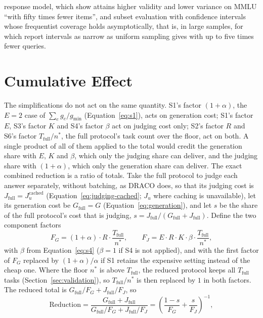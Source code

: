 \documentclass[11pt]{article}
\newcommand{\sectionbreak}{\par\ifdim\pagetotal<5.5\baselineskip\relax\else\clearpage\fi}
\begin{document}
response model, which \citet{hofmann2025fluid} show attains higher validity and lower
variance on MMLU ``with fifty times fewer items'', and subset evaluation with
confidence intervals whose frequentist coverage holds asymptotically, that is, in large samples, for which \citet{wu2026faq} report intervals as narrow as uniform sampling gives with up to five times fewer queries.

\sectionbreak
\section{Cumulative Effect}
\label{sec:cumulative}

The simplifications do not act on the same quantity. S1's factor $(1+\alpha)$, the $E = 2$ case of $\sum_{e} g_e / g_{\min}$ (Equation~\ref{eq:s1}), acts on
generation cost; S1's factor $E$, S3's factor $K$ and S4's factor $\beta$ act on judging
cost only; S2's factor $R$ and S6's factor $T_{\text{full}}/n^*$, the full protocol's task count over the floor, act on both. A single product of all of them applied to the total would credit the generation share with $E$, $K$ and $\beta$, which only the judging share can deliver, and the judging share with $(1+\alpha)$, which only the generation share can deliver. The exact combined reduction is a ratio of totals. Take the full protocol to judge
each answer separately, without batching, as DRACO does, so that its judging cost is
$J_{\text{full}} = J_u^{\text{cached}}$ (Equation~\ref{eq:judging-cached}; $J_u$ where
caching is unavailable), let its generation cost be $G_{\text{full}} = G$ (Equation~\ref{eq:generation}), and let $s$ be the share of the full protocol's cost that is
judging, $s = J_{\text{full}} / (G_{\text{full}} + J_{\text{full}})$. Define the two
component factors
\begin{equation}
F_G = (1+\alpha) \cdot R \cdot \frac{T_{\text{full}}}{n^*},
\qquad
F_J = E \cdot R \cdot K \cdot \beta \cdot \frac{T_{\text{full}}}{n^*},
\label{eq:component-factors}
\end{equation}
with $\beta$ from Equation~\ref{eq:s4} ($\beta = 1$ if S4 is not applied), and with the
first factor of $F_G$ replaced by $(1+\alpha)/\alpha$ if S1 retains the expensive setting instead of the cheap one. Where the floor $n^*$ is above $T_{\text{full}}$, the reduced protocol keeps all $T_{\text{full}}$ tasks (Section~\ref{sec:validation}), so $T_{\text{full}}/n^*$ is then replaced by $1$ in both factors. The reduced total is $G_{\text{full}}/F_G +
J_{\text{full}}/F_J$, so
\begin{equation}
\text{Reduction} = \frac{G_{\text{full}} + J_{\text{full}}}{G_{\text{full}}/F_G +
J_{\text{full}}/F_J} = \left( \frac{1-s}{F_G} + \frac{s}{F_J} \right)^{-1},
\label{eq:cumulative}
\end{equation}
\end{document}
